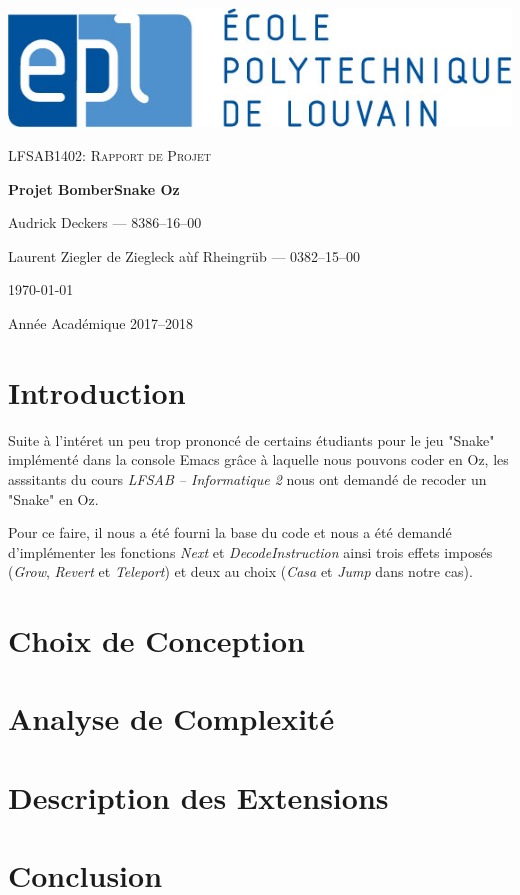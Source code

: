 \documentclass[11pt]{article}
\begin{document}
\setlength{\parskip}{10pt} %
\setlength{\parindent}{20pt}
\pagestyle{plain}

\begin{titlepage}
	\centering
	\includegraphics[scale=0.4]{epl-logo.jpg}\\
	\vspace{2cm}	
	{\scshape\Large LFSAB1402: Rapport de Projet\par}
	\vspace{2cm}
	{\huge\bfseries Projet BomberSnake Oz \par}
	\vspace{0.5cm}
	{\large Audrick Deckers --- 8386--16--00\par Laurent Ziegler de Ziegleck a\`{u}f Rheingr\"{u}b --- 0382--15--00\par}
	\vfill

	{\large \today \par Année Académique 2017--2018\par}
\end{titlepage}

\newpage

\part{Introduction}
Suite à l'intéret un peu trop prononcé de certains étudiants pour le jeu "Snake" implémenté dans la console Emacs grâce à laquelle nous pouvons coder en Oz, les asssitants du cours \emph{LFSAB -- Informatique 2} nous ont demandé de recoder un "Snake" en Oz.

Pour ce faire, il nous a été fourni la base du code et nous a été demandé d'implémenter les fonctions \emph{Next} et \emph{DecodeInstruction} ainsi trois effets imposés (\emph{Grow}, \emph{Revert} et \emph{Teleport}) et deux au choix (\emph{Casa} et \emph{Jump} dans notre cas).


\part{Choix de Conception}



\part{Analyse de Complexité}



\part{Description des Extensions}



\part{Conclusion}
\end{document}
